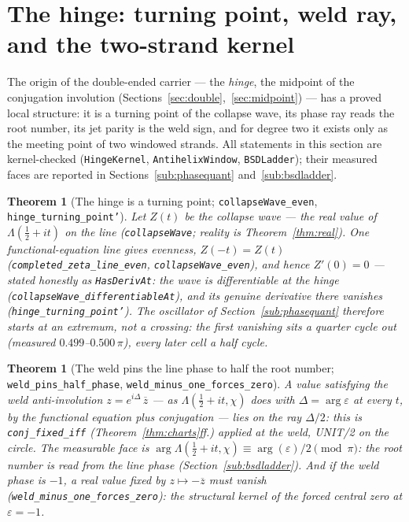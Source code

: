 \documentclass[11pt]{article}
\newtheorem{theorem}[definition]{Theorem}
\newcommand{\conj}[1]{\overline{#1}}
\newcommand{\code}[1]{\texttt{#1}}
\begin{document}
\section{The hinge: turning point, weld ray, and the two-strand kernel}\label{sec:hinge}

The origin of the double-ended carrier --- the \emph{hinge}, the midpoint of the conjugation
involution (Sections~\ref{sec:double},~\ref{sec:midpoint}) --- has a proved local structure: it is
a turning point of the collapse wave, its phase ray reads the root number, its jet parity is the
weld sign, and for degree two it exists only as the meeting point of two windowed strands.  All
statements in this section are kernel-checked (\code{HingeKernel}, \code{AntihelixWindow},
\code{BSDLadder}); their measured faces are reported in
Sections~\ref{sub:phasequant} and~\ref{sub:bsdladder}.

\begin{theorem}[The hinge is a turning point; \code{collapseWave\_even}, \code{hinge\_turning\_point'}]\label{thm:turning}
Let $Z(t)$ be the collapse wave --- the real value of $\Lambda(\tfrac12+it)$ on the line
(\code{collapseWave}; reality is Theorem~\ref{thm:real}).  One functional-equation line gives
evenness, $Z(-t)=Z(t)$ (\code{completed\_zeta\_line\_even}, \code{collapseWave\_even}), and hence
$Z'(0)=0$ --- stated honestly as \code{HasDerivAt}: the wave is differentiable at the hinge
(\code{collapseWave\_differentiableAt}), and its genuine derivative there vanishes
(\code{hinge\_turning\_point'}).  The oscillator of Section~\ref{sub:phasequant} therefore starts
at an extremum, not a crossing: the first vanishing sits a quarter cycle out (measured
$0.499$--$0.500\,\pi$), every later cell a half cycle.
\end{theorem}

\begin{theorem}[The weld pins the line phase to half the root number; \code{weld\_pins\_half\_phase}, \code{weld\_minus\_one\_forces\_zero}]\label{thm:weldray}
A value satisfying the weld anti-involution $z=e^{i\Delta}\,\conj z$ --- as $\Lambda(\tfrac12+it,\chi)$
does with $\Delta=\arg\varepsilon$ at \emph{every} $t$, by the functional equation plus conjugation
--- lies on the ray $\Delta/2$: this is \code{conj\_fixed\_iff} (Theorem~\ref{thm:charts}ff.)
applied at the weld, UNIT/2 on the circle.  The measurable face is
$\arg\Lambda(\tfrac12+it,\chi)\equiv\arg(\varepsilon)/2 \pmod\pi$: the root number is read from the
line phase (Section~\ref{sub:bsdladder}).  And if the weld phase is $-1$, a real value fixed by
$z\mapsto-\conj z$ must vanish (\code{weld\_minus\_one\_forces\_zero}): the structural kernel of the
forced central zero at $\varepsilon=-1$.
\end{theorem}
\end{document}
